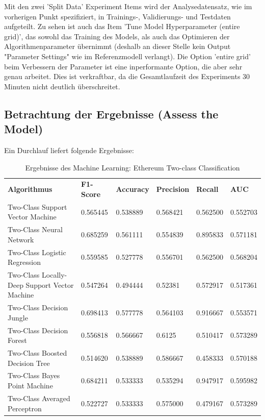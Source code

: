 Mit den zwei 'Split Data' Experiment Items wird der Analysedatensatz, wie im vorherigen Punkt spezifiziert, in Trainings-, Validierungs- und Testdaten aufgeteilt. Zu sehen ist auch das Item 'Tune Model Hyperparameter (entire grid)', das sowohl das Training des Models, als auch das Optimieren der Algorithmenparameter übernimmt (deshalb an dieser Stelle kein Output "Parameter Settings" wie im Referenzmodell verlangt). Die Option 'entire grid' beim Verbessern der Parameter ist eine inperformante Option, die aber sehr genau arbeitet. Dies ist verkraftbar, da die Gesamtlaufzeit des Experiments 30 Minuten nicht deutlich überschreitet.

\subsection{Betrachtung der Ergebnisse (Assess the Model)}
Ein Durchlauf liefert folgende Ergebnisse:

\begin{table}[H]
\centering
\begin{tabular}{|p{5cm}|p{}|p{}|p{}|p{}|p{}|}
\hline
\textbf{Algorithmus} & \textbf{F1-Score} & \textbf{Accuracy} & \textbf{Precision} & \textbf{Recall} & \textbf{AUC}\\ 
\hhline{======}
Two-Class Support Vector Machine & 0.565445 & 0.538889 & 0.568421 & 0.562500 & 0.552703 \\ \hline
Two-Class Neural Network & 0.685259 & 0.561111 & 0.554839 & 0.895833 & 0.571181 \\ \hline
Two-Class Logistic Regression & 0.559585 & 0.527778 & 0.556701 & 0.562500 & 0.568204 \\ \hline
Two-Class Locally-Deep Support Vector Machine & 0.547264 & 0.494444 & 0.52381 & 0.572917 & 0.517361 \\ \hline
Two-Class Decision Jungle & 0.698413 & 0.577778 & 0.564103 & 0.916667 & 0.553571 \\ \hline
Two-Class Decision Forest & 0.556818 & 0.566667 & 0.6125 & 0.510417 & 0.573289 \\ \hline
Two-Class Boosted Decision Tree & 0.514620 & 0.538889 & 0.586667 & 0.458333 & 0.570188 \\ \hline
Two-Class Bayes Point Machine & 0.684211 & 0.533333 & 0.535294 & 0.947917 & 0.595982 \\ \hline
Two-Class Averaged Perceptron & 0.522727 & 0.533333 & 0.575000 & 0.479167 & 0.573289 \\ \hline
\end{tabular}
\caption{Ergebnisse des Machine Learning: Ethereum Two-class Classification}
\label{tab:ETH2}
\end{table}

